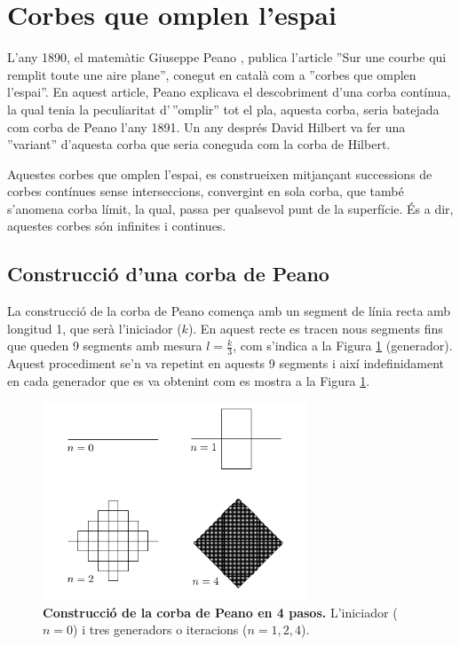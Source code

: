 \documentclass[12pt,a4paper]{report}
\begin{document}
\section{Corbes que omplen l'espai}
L’any 1890, el matemàtic Giuseppe Peano \cite{Asociacionceat}, publica l'article ''Sur une courbe qui remplit toute une aire plane'', conegut en català com a ''corbes que omplen l’espai''. En aquest article, Peano explicava el descobriment d'una corba contínua, la qual tenia la peculiaritat d'\,''omplir'' tot el pla, aquesta corba, seria batejada com corba de Peano l’any 1891. Un any després David Hilbert va fer una ''variant'' d'aquesta corba que seria coneguda com la corba de Hilbert.

Aquestes corbes que omplen l'espai, es construeixen mitjançant successions de corbes contínues sense interseccions, convergint en sola corba, que també s'anomena corba límit, la qual, passa per qualsevol punt de la superfície. És a dir, aquestes corbes són infinites i continues.
\subsection{Construcció d'una corba de Peano}
La construcció de la corba de Peano \cite[p.~92]{ChaosFractal} comença amb un segment de línia recta amb longitud 1, que serà l'iniciador ($k$). En aquest recte es tracen nous segments fins que queden 9 segments amb mesura $l = \displaystyle\frac{k}{3}$, com s'indica a la Figura \ref{img03_14} (generador). Aquest procediment se'n va repetint en aquests 9 segments i així  indefinidament en cada generador que es va obtenint com es mostra a la Figura \ref{img03_14}.  

\begin{figure}[!ht]
\centering
\includegraphics[width=0.7\textwidth]{img/img03_peano_00.pdf}
\caption{\textbf{Construcció de la corba de Peano en 4 pasos.} L'iniciador ($n = 0$) i tres generadors o iteracions ($n = 1, 2, 4$).}
\label{img03_14}
\end{figure}
\end{document}
